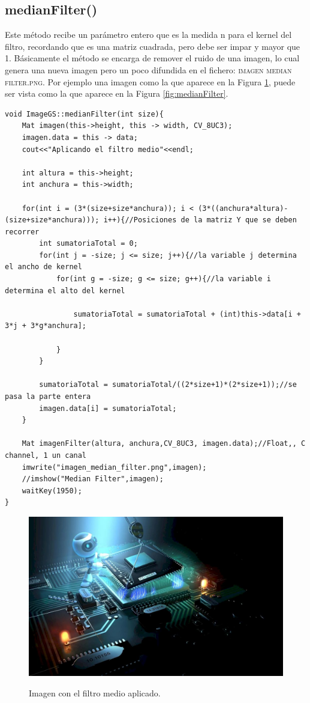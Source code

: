 \documentclass{article}
\begin{document}
\subsection{medianFilter()}
Este m\' etodo recibe un par\' ametro entero que es la medida n para el kernel del filtro, recordando que es una matriz cuadrada, pero debe ser impar y mayor que 1. 
B\' asicamente el m\' etodo se encarga de remover el ruido de una imagen, lo cual genera una nueva imagen pero un poco difundida en el fichero: \textsc{imagen median filter.png}. Por ejemplo una imagen como la que aparece en la Figura \ref{fig:original}, puede ser vista como la que aparece en la Figura \ref{fig:medianFilter}.

\begin{verbatim}
void ImageGS::medianFilter(int size){
	Mat imagen(this->height, this -> width, CV_8UC3);
	imagen.data = this -> data;
	cout<<"Aplicando el filtro medio"<<endl;
	
	int altura = this->height;
	int anchura = this->width;
	
	for(int i = (3*(size+size*anchura)); i < (3*((anchura*altura)-(size+size*anchura))); i++){//Posiciones de la matriz Y que se deben recorrer
		int sumatoriaTotal = 0;
		for(int j = -size; j <= size; j++){//la variable j determina el ancho de kernel
			for(int g = -size; g <= size; g++){//la variable i determina el alto del kernel
				
				sumatoriaTotal = sumatoriaTotal + (int)this->data[i + 3*j + 3*g*anchura];
				
			}	
		}
		
		sumatoriaTotal = sumatoriaTotal/((2*size+1)*(2*size+1));//se pasa la parte entera
		imagen.data[i] = sumatoriaTotal;		
	}
	
	Mat imagenFilter(altura, anchura,CV_8UC3, imagen.data);//Float,, C channel, 1 un canal
	imwrite("imagen_median_filter.png",imagen);
	//imshow("Median Filter",imagen);
	waitKey(1950);
}
\end{verbatim}


\begin{figure}[hbtp]
\caption{Imagen con el filtro medio aplicado.}
\centering
\includegraphics[scale=0.5]{imagenes/imagen1.png}
\label{fig:original}
\end{figure}
\end{document}
